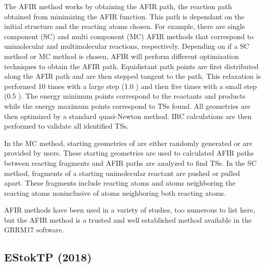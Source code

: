 \documentclass[preprint, 11pt]{elsarticle} %
\begin{document}
The AFIR method works by obtaining the AFIR path, the reaction path obtained from minimizing the AFIR function.
This path is dependant on the initial structure and the reacting atoms chosen. 
For example, there are single component (SC) and multi component (MC) AFIR methods that correspond to unimolecular and multimolecular reactions, respectively.
Depending on if a SC method or MC method is chosen, AFIR will perform different optimization techniques to obtain the AFIR path. 
Equidistant path points are first distributed along the AFIR path and are then stepped tangent to the path.
This relaxation is performed 10 times with a large step (1.0 \angstrom) and then five times with a small step (0.5 \angstrom). 
The energy minimum points correspond to the reactants and products while the energy maximum points correspond to TSs found. 
All geometries are then optimized by a standard quasi-Newton method.
IRC calculations are then performed to validate all identified TSs.

In the MC method, starting geometries of  are either randomly generated or are provided by users.
These starting geometries are used to calculated AFIR paths between reacting fragments and AFIR paths are analyzed to find TSs.
In the SC method, fragments of a starting unimolecular reactant are pushed or pulled apart. 
These fragments include reacting atoms and atoms neighboring the reacting atoms noninclusive of atoms neighboring both reacting atoms.

AFIR methods have been used in a variety of studies, too numerous to list here, but the AFIR method is a trusted and well established method available in the GRRM17 software.




\subsection{EStokTP (2018)}
\end{document}
